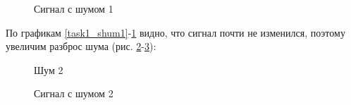 \documentclass[a4paper,oneside,14pt]{extreport}
\begin{document}
\begin{figure}[!h]
	\caption{Сигнал с шумом 1}
	\label{task1_signal_shum1}
\end{figure}

\newpage
По графикам \ref{task1_shum1}-\ref{task1_signal_shum1} видно, что сигнал почти не изменился, поэтому увеличим разброс шума (рис. \ref{task1_shum2}-\ref{task1_signal_shum2}):

\begin{figure}[!h]
	\caption{Шум 2}
	\label{task1_shum2}
\end{figure}

\begin{figure}[!h]
	\caption{Сигнал с шумом 2}
	\label{task1_signal_shum2}
\end{figure}
\end{document}
